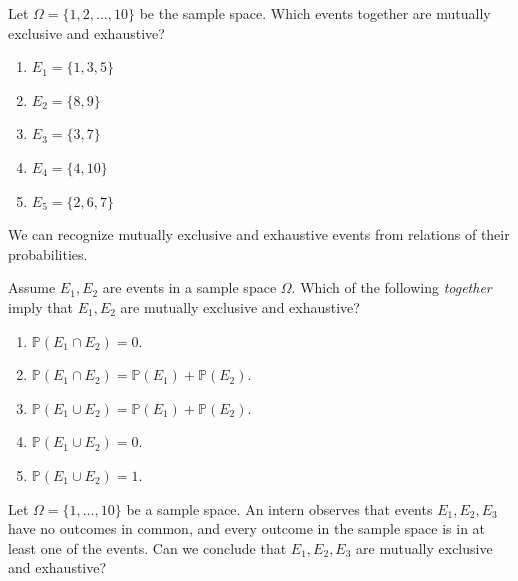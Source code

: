 \documentclass[../main.tex]{subfiles}
\begin{document}
\begin{exercise} \label{ex:mutually-exclusive-exhaustive-identify}
  Let \(\Omega = \{1,2,\ldots,10\}\)  be the sample space. Which events together are mutually exclusive and exhaustive?

    \begin{enumerate}[label=(\alph*)]
      \item \(E_{1} = \{1,3,5\}\)
      \item \(E_{2} = \{8,9\}\)
      \item \(E_{3} = \{3,7\}\)
      \item \(E_{4} = \{4,10\}\)
      \item \(E_{5} = \{2,6,7\}\)
    \end{enumerate}
\end{exercise}
\vfill{}
\clearpage

We can recognize mutually exclusive and exhaustive events from relations of their probabilities.
\begin{example} \label{ex:mutually-exclusive-from-probabilities}
  Assume \(E_{1}, E_{2}\) are events in a sample space \(\Omega\).  Which of the following  \emph{together} imply that \(E_{1}, E_{2}\) are mutually exclusive and exhaustive?
  \begin{enumerate}[label=(\alph*)]
    \item \(\mathbb{P}(E_{1} \cap E_{2}) = 0\).
    \item \(\mathbb{P}(E_{1} \cap E_{2}) = \mathbb{P}(E_{1}) + \mathbb{P}(E_{2})\).
    \item \(\mathbb{P}(E_{1} \cup E_{2}) = \mathbb{P}(E_{1}) + \mathbb{P}(E_{2})\).
    \item \(\mathbb{P}(E_{1} \cup E_{2}) = 0\).
    \item \(\mathbb{P}(E_{1} \cup E_{2}) = 1\).
  \end{enumerate}
\end{example}
\bigskip

\begin{example} \label{ex:mutually-exclusive-three-or-more}
  Let \(\Omega = \{1,\ldots,10\}\) be a sample space.  An intern observes that events \(E_{1}, E_{2}, E_{3}\)  have no outcomes in common, and every outcome in the sample space is in at least one of the events. Can we conclude that \(E_{1}, E_{2}, E_{3}\) are mutually exclusive and exhaustive?

\end{example}
\end{document}
